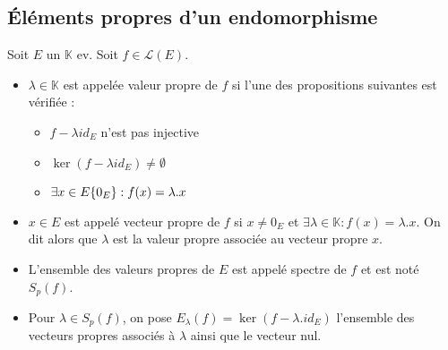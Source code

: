\subsection{Éléments propres d'un endomorphisme}
\begin{defi} Soit $E$ un $\mathbb{K}$ ev. Soit $f\in\mathscr{L}(E)$.\begin{itemize}
    \item $\lambda\in\mathbb{K}$ est appelée valeur propre de $f$ si l'une des propositions suivantes est vérifiée :\begin{itemize}
            \item $f-\lambda id_E$ n'est pas injective
            \item $\ker (f-\lambda id_E)\neq \emptyset$
            \item $\exists x\in E\\\{0_E\}: f(x) = \lambda.x$
        \end{itemize}
    \item $x\in E$ est appelé vecteur propre de $f$ si $x\neq 0_E$ et $\exists\lambda\in\mathbb{K}: f(x)=\lambda.x$. On dit alors que $\lambda$ est la valeur propre associée au vecteur propre $x$.
    \item L'ensemble des valeurs propres de $E$ est appelé spectre de $f$ et est noté $S_p(f)$.
    \item Pour $\lambda\in S_p(f)$, on pose $E_\lambda(f)=\ker(f-\lambda.id_E)$ l'ensemble des vecteurs propres associés à $\lambda$ ainsi que le vecteur nul.
\end{itemize}\end{defi}
